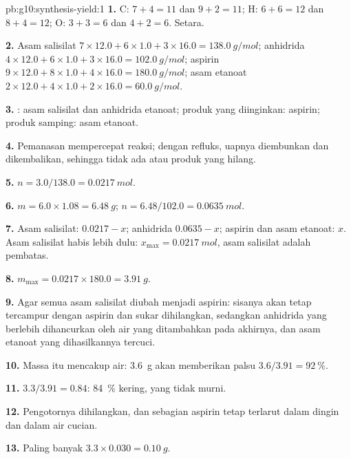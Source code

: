 \begin{solution}{pb:g10:synthesis-yield:1}
\textbf{1.} C: $7 + 4 = 11$ dan $9 + 2 = 11$; H: $6 + 6 = 12$ dan
$8 + 4 = 12$; O: $3 + 3 = 6$ dan $4 + 2 = 6$. Setara.

\textbf{2.} Asam salisilat $7 \times 12.0 + 6 \times 1.0 + 3 \times 16.0
= \qty{138.0}{g/mol}$; anhidrida $4 \times 12.0 + 6 \times 1.0 +
3 \times 16.0 = \qty{102.0}{g/mol}$; aspirin $9 \times 12.0 + 8 \times
1.0 + 4 \times 16.0 = \qty{180.0}{g/mol}$; asam etanoat $2 \times 12.0
+ 4 \times 1.0 + 2 \times 16.0 = \qty{60.0}{g/mol}$.

\textbf{3.} : asam salisilat dan anhidrida etanoat; produk yang
diinginkan: aspirin; produk samping: asam etanoat.

\textbf{4.} Pemanasan mempercepat reaksi; dengan refluks, uapnya
diembunkan dan dikembalikan, sehingga tidak ada  atau produk
yang hilang.

\textbf{5.} $n = 3.0 / 138.0 = \qty{0.0217}{mol}$.

\textbf{6.} $m = 6.0 \times 1.08 = \qty{6.48}{g}$;
$n = 6.48 / 102.0 = \qty{0.0635}{mol}$.

\textbf{7.} Asam salisilat: $0.0217 - x$; anhidrida $0.0635 - x$;
aspirin dan asam etanoat: $x$. Asam salisilat habis lebih dulu:
$x_{\max} = \qty{0.0217}{mol}$, asam salisilat adalah pembatas.

\textbf{8.} $m_{\max} = 0.0217 \times 180.0 = \qty{3.91}{g}$.

\textbf{9.} Agar semua asam salisilat diubah menjadi aspirin: sisanya
akan tetap tercampur dengan aspirin dan sukar dihilangkan, sedangkan
anhidrida yang berlebih dihancurkan oleh air yang ditambahkan pada
akhirnya, dan asam etanoat yang dihasilkannya tercuci.

\textbf{10.} Massa itu mencakup air: \qty{3.6}{g} akan memberikan
 palsu $3.6 / 3.91 = \qty{92}{\percent}$.

\textbf{11.} $3.3 / 3.91 = 0.84$: \qty{84}{\percent} 
kering, yang tidak murni.

\textbf{12.} Pengotornya dihilangkan, dan sebagian aspirin tetap
terlarut dalam  dingin dan dalam air cucian.

\textbf{13.} Paling banyak $3.3 \times 0.030 = \qty{0.10}{g}$.


\end{solution}
